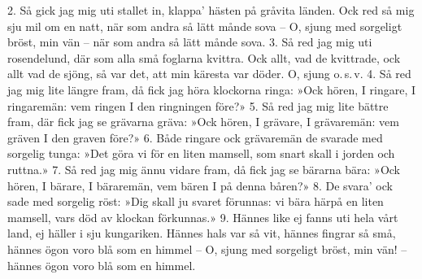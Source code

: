 2. Så gick jag mig uti stallet in,
   klappa' hästen på gråvita länden.
   Ock red så mig sju mil om en natt,
   när som andra så lätt månde sova --
   \qquad{}O, sjung med sorgeligt bröst, min vän --
   \qquad{}när som andra så lätt månde sova.
3. Så red jag mig uti rosendelund,
   där som alla små foglarna kvittra.
   Ock allt, vad de kvittrade, ock allt vad de sjöng,
   så var det, att min käresta var döder.
   \qquad{}O, sjung o.\,s.\,v.
4. Så red jag mig lite längre fram,
   då fick jag höra klockorna ringa:
   »Ock hören, I ringare, I ringaremän:
   vem ringen I den ringningen före?»
5. Så red jag mig lite bättre fram,
   där fick jag se grävarna gräva:
   »Ock hören, I grävare, I grävaremän:
   vem gräven I den graven före?»
6. Både ringare ock grävaremän
   de svarade med sorgelig tunga:
   »Det göra vi för en liten mamsell,
   som snart skall i jorden och ruttna.»
7. Så red jag mig ännu vidare fram,
   då fick jag se bärarna bära:
   »Ock hören, I bärare, I bäraremän,
   vem bären I på denna båren?»
8. De svara' ock sade med sorgelig röst:
   »Dig skall ju svaret förunnas:
   vi bära härpå en liten mamsell,
   vars död av klockan förkunnas.»
9. Hännes like ej fanns uti hela vårt land,
   ej häller i sju kungariken.
   Hännes hals var så vit, hännes fingrar så små,
   hännes ögon voro blå som en himmel --
   \qquad{}O, sjung med sorgeligt bröst, min vän! --
   \qquad{}hännes ögon voro blå som en himmel.
